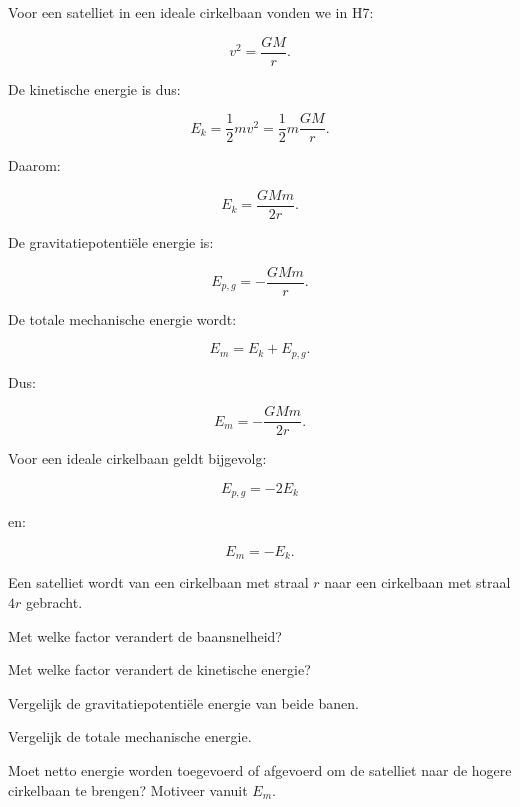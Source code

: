 \documentclass{ximera}
\begin{document}

Voor een satelliet in een ideale cirkelbaan vonden we in H7:

\[
v^2=\frac{GM}{r}.
\]

De kinetische energie is dus:

\[
E_k
=
\frac12mv^2
=
\frac12m\frac{GM}{r}.
\]

Daarom:

\[
\boxed{
E_k=\frac{GMm}{2r}.
}
\]

De gravitatiepotentiële energie is:

\[
\boxed{
E_{p,g}=-\frac{GMm}{r}.
}
\]

De totale mechanische energie wordt:

\[
E_m=E_k+E_{p,g}.
\]

Dus:

\[
\boxed{
E_m=-\frac{GMm}{2r}.
}
\]

Voor een ideale cirkelbaan geldt bijgevolg:

\[
\boxed{
E_{p,g}=-2E_k
}
\]

en:

\[
\boxed{
E_m=-E_k.
}
\]


\begin{oefening}{\oefG}

Een satelliet wordt van een cirkelbaan met straal $r$ naar een cirkelbaan met
straal $4r$ gebracht.

\begin{question}
Met welke factor verandert de baansnelheid?
\end{question}

\begin{question}
Met welke factor verandert de kinetische energie?
\end{question}

\begin{question}
Vergelijk de gravitatiepotentiële energie van beide banen.
\end{question}

\begin{question}
Vergelijk de totale mechanische energie.
\end{question}

\begin{question}
Moet netto energie worden toegevoerd of afgevoerd om de satelliet naar de
hogere cirkelbaan te brengen? Motiveer vanuit $E_m$.
\end{question}

\end{oefening}
\end{document}
